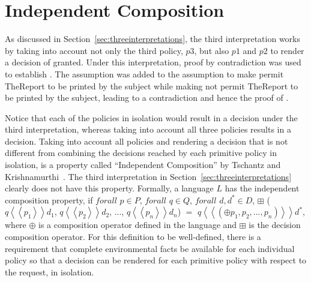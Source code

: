 \section{Independent Composition}

As discussed in Section~\ref{sec:threeinterpretations}, the third interpretation works by taking into account not only the third policy, $p3$, but also $p1$ and $p2$ to render a decision of granted. Under this interpretation, proof by contradiction was used to establish . The assumption  was added to the assumption  to make  permit TheReport to be printed by the subject while making  not permit TheReport to be printed by the subject, leading to a contradiction and hence the proof of . 

Notice that each of the policies in isolation would result in a  decision under the third interpretation, whereas taking into account all three policies results in a  decision. Taking into account all policies and rendering a decision that is not different from combining the decisions reached by each primitive policy in isolation, is a property called ``Independent Composition'' by Tschantz and Krishnamurthi~\cite{Tschantz}. The third interpretation in Section~\ref{sec:threeinterpretations} clearly does not have this property. Formally, a language $L$ has the independent composition property, if $forall$ $p \in P$, $forall$ $q \in Q$, $forall$ $d, d^\ast \in D$, $\boxplus$ ($q \left\langle\left\langle p_{1}  \right\rangle\right\rangle d_{1}$, $q \left\langle\left\langle p_{2}  \right\rangle\right\rangle d_{2}$, ..., $q \left\langle\left\langle p_{n}  \right\rangle\right\rangle d_{n}$) $=$ $q \left\langle\left\langle (\oplus p_{1}, p_{2}, ..., p_{n}) \right\rangle\right\rangle d^\ast$, \\where $\oplus$ is a composition operator defined in the language and $\boxplus$ is the decision composition operator. For this definition to be well-defined, there is a requirement that complete environmental facts be available for each individual policy so that a decision can be rendered for each primitive policy with respect to the request, in isolation.

